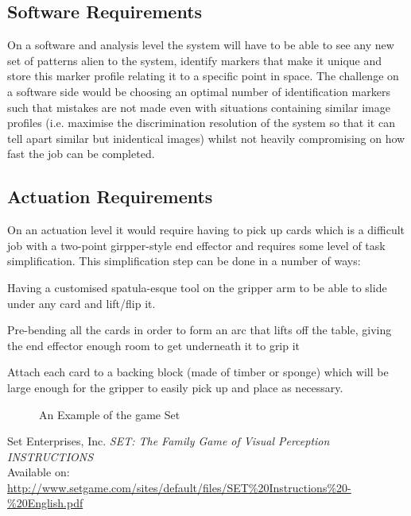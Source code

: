 \documentclass[dvips,12pt]{article}
\begin{document}
	\subsection{Software Requirements}
		On a software and analysis level the system will have to be able to see any new set of patterns alien to the system, identify markers that make it unique and store this marker profile relating it to a specific point in space. The challenge on a software side would be choosing an optimal number of  identification markers such that mistakes are not made even with situations containing similar image profiles (i.e. maximise the discrimination resolution of the system so that it can tell apart similar but inidentical images) whilst not heavily compromising on how fast the job can be completed.
	\subsection{Actuation Requirements}
		On an actuation level it would require having to pick up cards which is a difficult job with a two-point girpper-style end effector and requires some level of task simplification. This simplification step can be done in a number of ways:
		\begin{list}{:~}{}
			\item Having a customised spatula-esque tool on the gripper arm to be able to slide under any card and lift/flip it.
			\item Pre-bending all the cards in order to form an arc that lifts off the table, giving the end effector enough room to get underneath it to grip it
			\item Attach each card to a backing block (made of timber or sponge) which will be large enough for the gripper to easily pick up and place as necessary.
		\end{list}
		

		\begin{figure}[position = here]
			\begin{center}
				\caption{An Example of the game Set\label{pic1}}
			\end{center}
		\end{figure}
		
		\newpage
		\begin{thebibliography}{99}
			
			 Set Enterprises, Inc. \emph{SET: The Family Game of Visual Perception INSTRUCTIONS}\\
			Available on:\\ \url{http://www.setgame.com/sites/default/files/SET%20Instructions%20-%20English.pdf}	
			
		\end{thebibliography}
		
\end{document}
